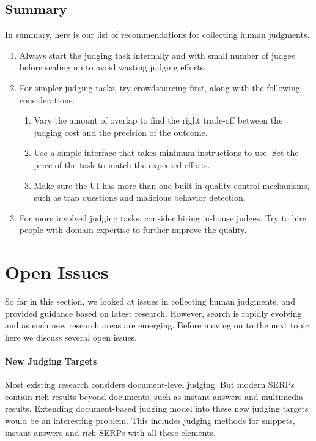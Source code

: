 \subsection{Summary}
In summary, here is our list of recommendations for collecting human judgments.

\begin{enumerate}
	\item Always start the judging task internally and with small number of judges before scaling up to avoid wasting judging efforts.
	\item For simpler judging tasks, try crowdsourcing first, along with the following considerations:
	\begin{enumerate}
		\item Vary the amount of overlap to find the right trade-off between the judging cost and the precision of the outcome.
		\item Use a simple interface that takes minimum instructions to use. Set the price of the task to match the expected efforts.
		\item Make sure the UI has more than one built-in quality control mechanisms, such as trap questions and malicious behavior detection.
	\end{enumerate}
	\item For more involved judging tasks, consider hiring in-house judges. Try to hire people with domain expertise to further improve the quality.
\end{enumerate}

\section{Open Issues}
So far in this section, we looked at issues in collecting human judgments, and provided guidance based on latest research. However, search is rapidly evolving and as such new research areas are emerging. Before moving on to the next topic, here we discuss several open issues.

\paragraph{New Judging Targets} Most existing research considers document-level judging. But modern SERPs contain rich results beyond documents, such as instant answers and multimedia results. Extending document-based judging model into these new judging targets would be an interesting problem. This includes judging methods for snippets, instant answers and rich SERPs with all these elements.


